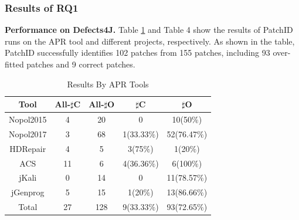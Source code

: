 \subsubsection{Results of RQ1}\label{5.3.3}
\textbf{Performance on Defects4J.} Table \ref{tab3} and Table 4 show the results of PatchID runs on the APR tool and different projects, respectively. As shown in the table, PatchID successfully identifies 102 patches from 155 patches, including 93 over-fitted patches and 9 correct patches.
\begin{table}[ht]
		\begin{minipage}{\textwidth}
			\caption{Results By APR Tools}\label{tab3}%
			\begin{tabular}{ccccc}
				\toprule
				Tool & All-$\sharp$C & All-$\sharp$O &$\sharp$C  &$\sharp$O\\
				\midrule
				Nopol2015    &4 &20 &0 &10(50$\%$) \\
				Nopol2017    &3 &68 &1(33.33$\%$) &52(76.47$\%$)\\
				HDRepair    &4 &5 &3(75$\%$) &1(20$\%$) \\
				ACS    &11 &6 &4(36.36$\%$) &6(100$\%$)\\
				jKali    &0 &14 &0 &11(78.57$\%$)\\
				jGenprog    &5 &15 &1(20$\%$) &13(86.66$\%$)\\
				Total    &27 &128 &9(33.33$\%$) &93(72.65$\%$)\\
				\bottomrule
			\end{tabular}
			
		\end{minipage}
\end{table}

